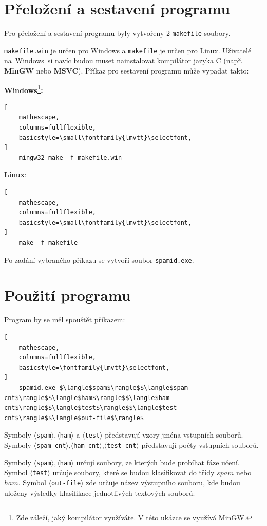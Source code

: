 \documentclass[12pt]{report}
\begin{document}
\section{Přeložení a sestavení programu}
Pro přeložení a sestavení programu byly vytvořeny 2 \verb|makefile| soubory. 

\verb|makefile.win| je určen pro Windows a \verb|makefile| je určen pro Linux. Uživatelé na~Windows~si navíc budou muset nainstalovat kompilátor jazyka C (např. {\bfseries MinGW} nebo {\bfseries MSVC}). Příkaz pro sestavení programu může vypadat takto:

{\bfseries Windows\footnote{Zde záleží, jaký kompilátor využíváte. V této ukázce se využívá MinGW.}:} 
\begin{lstlisting}[
    mathescape,
    columns=fullflexible,
    basicstyle=\small\fontfamily{lmvtt}\selectfont,
]
    mingw32-make -f makefile.win
\end{lstlisting}
{\bfseries Linux}:
\begin{lstlisting}[
    mathescape,
    columns=fullflexible,
    basicstyle=\small\fontfamily{lmvtt}\selectfont,
]
    make -f makefile
\end{lstlisting}
Po zadání vybraného příkazu se vytvoří soubor \verb|spamid.exe|.
\newpage
\section{Použití programu}
Program by se měl spouštět příkazem:
\begin{lstlisting}[
    mathescape,
    columns=fullflexible,
    basicstyle=\fontfamily{lmvtt}\selectfont,
]
    spamid.exe $\langle$spam$\rangle$$\langle$spam-cnt$\rangle$$\langle$ham$\rangle$$\langle$ham-cnt$\rangle$$\langle$test$\rangle$$\langle$test-cnt$\rangle$$\langle$out-file$\rangle$
\end{lstlisting}
Symboly $\langle$\verb|spam|$\rangle,\langle$\verb|ham|$\rangle$ a $\langle$\verb|test|$\rangle$ představují vzory jména vstupních souborů. Symboly $\langle$\verb|spam-cnt|$\rangle$,$\langle$\verb|ham-cnt|$\rangle$,$\langle$\verb|test-cnt|$\rangle$ představují počty vstupních souborů. 

Symboly $\langle$\verb|spam|$\rangle,\langle$\verb|ham|$\rangle$ určují soubory, ze kterých bude probíhat fáze učení.
Symbol $\langle$\verb|test|$\rangle$ určuje soubory, které se budou klasifikovat do třídy $spam$ nebo $ham$.
Symbol $\langle$\verb|out-file|$\rangle$ zde určuje název výstupního souboru, kde budou uloženy výsledky klasifikace jednotlivých textových souborů.
\end{document}
